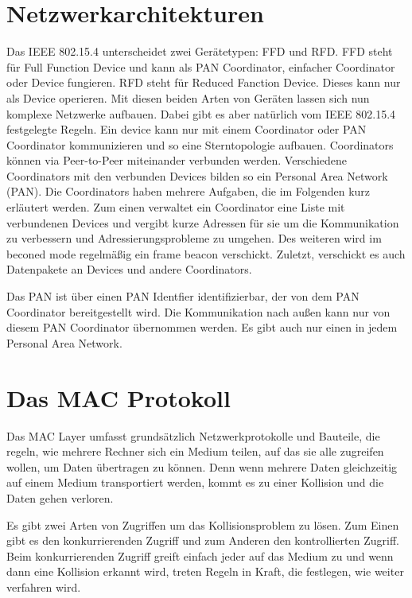 \documentclass[a4paper, 12pt]{scrreprt}
\begin{document}
\chapter{Netzwerkarchitekturen}
Das IEEE 802.15.4 unterscheidet zwei Gerätetypen: FFD und RFD.
FFD steht für Full Function Device und kann als PAN Coordinator, einfacher Coordinator oder Device fungieren.
RFD steht für Reduced Fanction Device. Dieses kann nur als Device operieren.
Mit diesen beiden Arten von Geräten lassen sich nun komplexe Netzwerke aufbauen. Dabei gibt es aber natürlich vom IEEE 802.15.4 festgelegte Regeln.
Ein device kann nur mit einem Coordinator oder PAN Coordinator kommunizieren und so eine Sterntopologie aufbauen. Coordinators können via Peer-to-Peer miteinander verbunden werden. Verschiedene Coordinators mit den verbunden Devices bilden so ein Personal Area Network (PAN).
Die Coordinators haben mehrere Aufgaben, die im Folgenden kurz erläutert werden.
Zum einen verwaltet ein Coordinator eine Liste mit verbundenen Devices und vergibt kurze Adressen für sie um die Kommunikation zu verbessern und Adressierungsprobleme zu umgehen.
Des weiteren wird im beconed mode regelmäßig ein frame beacon verschickt. Zuletzt, verschickt es auch Datenpakete an Devices und andere Coordinators.

Das PAN ist über einen PAN Identfier identifizierbar, der von dem PAN Coordinator bereitgestellt wird. Die Kommunikation nach außen kann nur von diesem PAN Coordinator übernommen werden. Es gibt auch nur einen in jedem Personal Area Network. 



\chapter{Das MAC Protokoll}
Das MAC Layer umfasst grundsätzlich Netzwerkprotokolle und Bauteile, die regeln, wie mehrere Rechner sich ein Medium teilen, auf das sie alle zugreifen wollen, um Daten übertragen zu können. Denn wenn mehrere Daten gleichzeitig auf einem Medium transportiert werden, kommt es zu einer Kollision und die Daten gehen verloren.

Es gibt zwei Arten von Zugriffen um das Kollisionsproblem zu lösen. Zum Einen gibt es den konkurrierenden Zugriff und zum Anderen den kontrollierten Zugriff.
Beim konkurrierenden Zugriff greift einfach jeder auf das Medium zu und wenn dann eine Kollision erkannt wird, treten Regeln in Kraft, die festlegen, wie weiter verfahren wird.
\\
\end{document}
